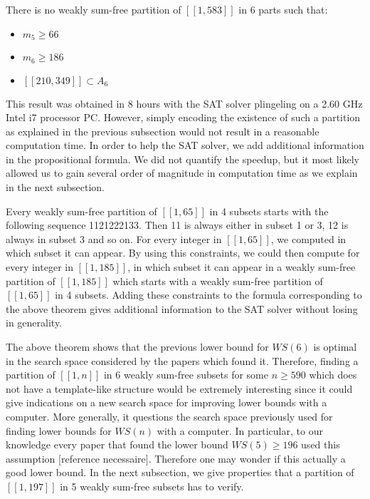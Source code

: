 \begin{computational theorem}
There is no weakly sum-free partition of \([\![1,583]\!]\) in 6 parts such that:
\begin{itemize}
	\item \(m_5 \geqslant 66\)
	\item \(m_6 \geqslant 186\)
	\item \([\![210,349]\!] \subset A_6\)
\end{itemize}
\end{computational theorem}

This result was obtained in 8 hours with the SAT solver plingeling \cite{Lingeling2017} on a 2.60 GHz Intel
i7 processor PC.
However, simply encoding the existence of such a partition as explained in the previous subsection would not result in a
reasonable
computation time. In order to help the SAT solver, we add additional information in the propositional formula. We did
not quantify the
speedup, but it most likely allowed us to gain several order of magnitude in computation time as we explain in the next
subsection.

\par
Every weakly sum-free partition of \([\![1,65]\!]\) in 4 subsets starts with the following sequence 1121222133. Then 11
is always
either in subset 1 or 3, 12 is always in subset 3 and so on. For every integer in \([\![1,65]\!]\), we computed in which
subset it can appear.
By using this constraints, we could then compute for every integer in \([\![1,185]\!]\), in which subset it can appear
in a weakly sum-free
partition of \([\![1,185]\!]\) which starts with a weakly sum-free partition of \([\![1,65]\!]\) in 4 subsets. Adding
these constraints to the
formula corresponding to the above theorem gives additional information to the SAT solver without losing in generality.

\par
The above theorem shows that the previous lower bound for \(WS(6)\) is optimal in the search space considered by the
papers which found it.
Therefore, finding a partition of \([\![1,n]\!]\) in 6 weakly sum-free subsets for some \(n \geqslant 590\) which does
not have a template-like structure
would be extremely interesting since it could give indications on a new search space for improving lower bounds with a
computer. More generally,
it questions the search space previously used for finding lower bounds for \(WS(n)\) with a computer. In particular, to
our knowledge every paper
that found the lower bound \(WS(5) \geqslant 196\) used this assumption [reference necessaire]. Therefore one may wonder
if this actually a good lower
bound. In the next subsection, we give properties that a partition of \([\![1,197]\!]\) in 5 weakly sum-free subsets has
to verify.


